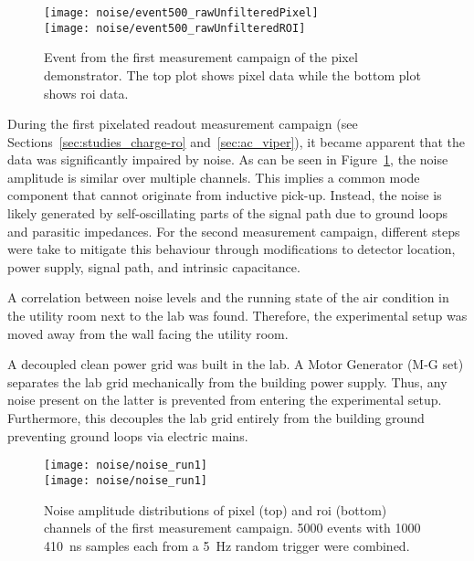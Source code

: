 \begin{figure}[htb]
	\centering
	\texttt{[image: noise/event500\_rawUnfilteredPixel]}\\
	\texttt{[image: noise/event500\_rawUnfilteredROI]}
	\caption[Event from first pixel demonstrator measurement campaign]{%
		Event from the first measurement campaign of the pixel demonstrator.
		The top plot shows pixel data while the bottom plot shows \acrshort{roi} data.
	}
	\label{fig:electronics_event-run1}
\end{figure}

During the first pixelated readout measurement campaign (see Sections~\ref{sec:studies_charge-ro} and~\ref{sec:ac_viper}), it became apparent that the data was significantly impaired by noise.
As can be seen in Figure~\ref{fig:electronics_event-run1}, the noise amplitude is similar over multiple channels.
This implies a common mode component that cannot originate from inductive pick-up.
Instead, the noise is likely generated by self-oscillating parts of the signal path due to ground loops and parasitic impedances.
For the second measurement campaign, different steps were take to mitigate this behaviour through modifications to detector location, power supply, signal path, and intrinsic capacitance.

A correlation between noise levels and the running state of the air condition in the utility room next to the lab was found.
Therefore, the experimental setup was moved away from the wall facing the utility room.

A decoupled clean power grid was built in the lab.
A Motor Generator (M-G set) separates the lab grid mechanically from the building power supply.
Thus, any noise present on the latter is prevented from entering the experimental setup.
Furthermore, this decouples the lab grid entirely from the building ground preventing ground loops via electric mains.

\begin{figure}[htb]
	\centering
	\texttt{[image: noise/noise\_run1]} \\
	\texttt{[image: noise/noise\_run1]}
	\caption[Noise distributions from first pixel demonstrator measurement campaign]{%
		Noise amplitude distributions of pixel (top) and \acrshort{roi} (bottom) channels of the first measurement campaign.
		\num{5000} events with \num{1000} \SI{410}{\nano\second} samples each from a \SI{5}{\hertz} random trigger were combined.
	}
	\label{fig:electronics_noise-run1}
\end{figure}


